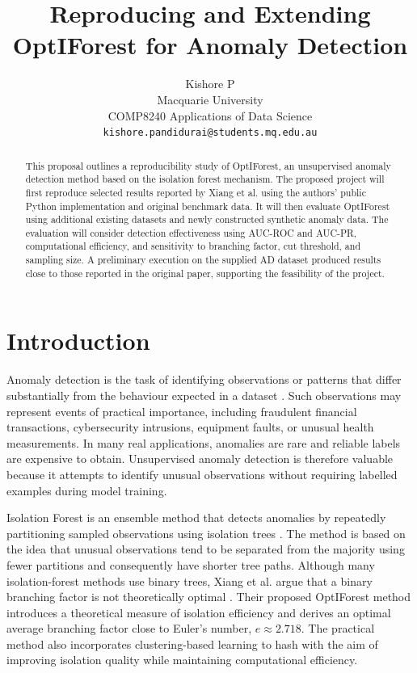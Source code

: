 \documentclass[11pt]{article}
\title{Reproducing and Extending OptIForest for Anomaly Detection}
\author{
  Kishore P \\
  Macquarie University \\
  COMP8240 Applications of Data Science \\
  \texttt{kishore.pandidurai@students.mq.edu.au}
}
\begin{document}
\maketitle

\begin{abstract}
This proposal outlines a reproducibility study of OptIForest, an
unsupervised anomaly detection method based on the isolation forest
mechanism. The proposed project will first reproduce selected results
reported by Xiang et al. using the authors' public Python implementation
and original benchmark data. It will then evaluate OptIForest using
additional existing datasets and newly constructed synthetic anomaly
data. The evaluation will consider detection effectiveness using
AUC-ROC and AUC-PR, computational efficiency, and sensitivity to
branching factor, cut threshold, and sampling size. A preliminary
execution on the supplied AD dataset produced results close to those
reported in the original paper, supporting the feasibility of the
project.
\end{abstract}

\section{Introduction}
Anomaly detection is the task of identifying observations or patterns
that differ substantially from the behaviour expected in a dataset
\citep{chandola2009anomaly}. Such observations may represent events of
practical importance, including fraudulent financial transactions,
cybersecurity intrusions, equipment faults, or unusual health
measurements. In many real applications, anomalies are rare and
reliable labels are expensive to obtain. Unsupervised anomaly detection
is therefore valuable because it attempts to identify unusual
observations without requiring labelled examples during model training.

Isolation Forest is an ensemble method that detects anomalies by
repeatedly partitioning sampled observations using isolation trees
\citep{liu2008isolation}. The method is based on the idea that unusual
observations tend to be separated from the majority using fewer
partitions and consequently have shorter tree paths. Although many
isolation-forest methods use binary trees, Xiang et al. argue that a
binary branching factor is not theoretically optimal
\citep{xiang2023optiforest}. Their proposed OptIForest method introduces
a theoretical measure of isolation efficiency and derives an optimal
average branching factor close to Euler's number, \(e \approx 2.718\).
The practical method also incorporates clustering-based learning to
hash with the aim of improving isolation quality while maintaining
computational efficiency.
\end{document}
